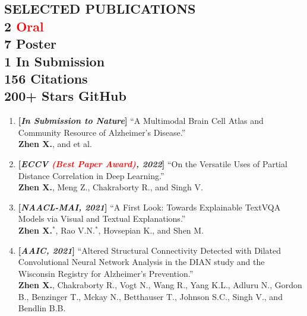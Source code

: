 \documentclass[margin]{res}
\begin{document}
\begin{resume}
\section{SELECTED PUBLICATIONS \\ \small{ 2 {\textcolor{red}{Oral}}\\ 7 Poster\\ 1 In Submission \\ 156 Citations \\ 200+ Stars GitHub}  }
                \begin{enumerate}[noitemsep,wide=0pt,leftmargin=\dimexpr\labelwidth + 2\labelsep\relax]\itemsep -0.0pt
                \item \textbf{[\emph{In Submission to Nature}]} ``A Multimodal Brain Cell Atlas and Community Resource of Alzheimer's Disease.''\\
                				\textbf{Zhen X.}, and et al.
                \item \textbf{[\emph{ECCV \textcolor{red}{(Best Paper Award)}, 2022}]} ``On the Versatile Uses of Partial Distance Correlation in Deep Learning.''\\
                            \textbf{Zhen X.}, Meng Z., Chakraborty R., and Singh V.
                \item \textbf{[\emph{NAACL-MAI, 2021}]} ``A First Look: Towards Explainable TextVQA Models via Visual and Textual Explanations.''\\
                            \textbf{Zhen X.}$^*$, Rao V.N.$^*$, Hovsepian K., and Shen M.
                \item \textbf{[\emph{AAIC, 2021}]} ``Altered Structural Connectivity Detected with Dilated Convolutional Neural Network Analysis in the DIAN study and the Wisconsin Registry for Alzheimer's Prevention.''\\
                            \textbf{Zhen X.}, Chakraborty R., Vogt N., Wang R., Yang K.L., Adluru N., Gordon B., Benzinger T., Mckay N., Betthauser T., Johnson S.C., Singh V., and Bendlin B.B.

\end{enumerate}
\end{resume}
\end{document}
